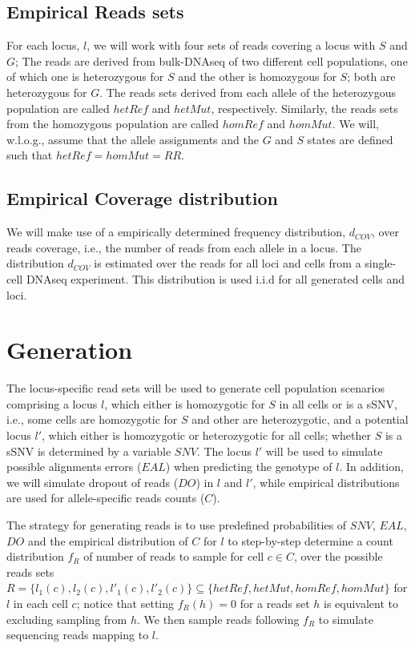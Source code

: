 \documentclass[a4paper,11pt]{article}
\begin{document}
\subsection{Empirical Reads sets}
\label{sec:reads-sets}


For each locus, $l$, we will work with four sets of reads covering a
locus with $S$ and $G$; The reads are derived from bulk-DNAseq of two
different cell populations, one of which one is heterozygous for $S$
and the other is homozygous for $S$; both are heterozygous for
$G$. The reads sets derived from each allele of the heterozygous
population are called $hetRef$ and $hetMut$, respectively. Similarly,
the reads sets from the homozygous population are called $homRef$ and
$homMut$. We will, w.l.o.g., assume that the allele assignments and
the $G$ and $S$ states are defined such that $hetRef=homMut=RR$.

\subsection{Empirical Coverage distribution}
\label{sec:cover-distr}
We will make use of a empirically determined frequency distribution,
$d_{COV}$, over reads coverage, i.e., the number of reads from each
allele in a locus. The distribution $d_{COV}$ is estimated over the
reads for all loci and cells from a single-cell DNAseq
experiment. This distribution is used i.i.d for all generated cells
and loci.


\section{Generation}
\label{sec:generation}
The locus-specific read sets will be used to generate cell population
scenarios comprising a locus $l$, which either is homozygotic for $S$
in all cells or is a sSNV, i.e., some cells are homozygotic for $S$
and other are heterozygotic, and a potential locus $l'$, which either
is homozygotic or heterozygotic for all cells; whether $S$ is a sSNV
is determined by a variable $SNV$.  The locus $l'$ will be used to
simulate possible alignments errors ($EAL$) when predicting the
genotype of $l$.
%
In addition, we will simulate dropout of reads ($DO$) in $l$ and
 $l'$, while empirical distributions are used for
allele-specific reads counts ($C$).

The strategy for generating reads is to use predefined probabilities
of $SNV$, $EAL$, $DO$ and the empirical distribution of $C$ for $l$
to step-by-step determine a count distribution $f_R$ of number of
reads to sample for cell $c\in C$, over the possible reads sets
$R=\{l_1(c), l_2(c), l'_1(c), l'_2(c)\} \subseteq \{hetRef, hetMut, homRef, homMut\}$
for $l$ in each cell $c$; notice that setting $f_R(h)=0$ for a reads
set $h$ is equivalent to excluding sampling from $h$. We then sample
reads following $f_R$ to simulate sequencing reads mapping to $l$.
\end{document}
